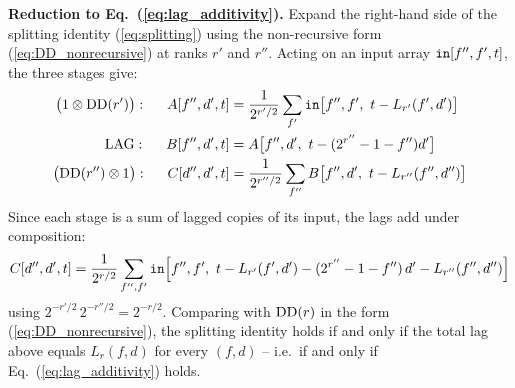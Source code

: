 \documentclass{article}
\numberwithin{equation}{section}   %
\def\DD{{\rm DD}}
\def\LAG{{\rm LAG}}
\def\nn{\nonumber}
\begin{document}
\par\noindent
{\bf Reduction to Eq.\ (\ref{eq:lag_additivity}).}
Expand the right-hand side of the splitting identity (\ref{eq:splitting}) using the
non-recursive form (\ref{eq:DD_nonrecursive}) at ranks $r'$ and $r''$. Acting on an input array
${\tt in}[f'', f', t]$, the three stages give:
\begin{align}
\big( 1 \otimes \DD(r') \big): \hspace{0.5cm}
  A[f'', d', t] &= \frac{1}{2^{r'/2}} \sum_{f'} {\tt in}\big[ f'', f',\ t - L_{r'}(f', d') \big] \nn \\
\LAG: \hspace{0.5cm}
  B[f'', d', t] &= A\big[ f'', d',\ t - (2^{r''}-1-f'') d' \big] \nn \\
\big( \DD(r'') \otimes 1 \big): \hspace{0.5cm}
  C[d'', d', t] &= \frac{1}{2^{r''/2}} \sum_{f''} B\big[ f'', d',\ t - L_{r''}(f'', d'') \big]
\end{align}
Since each stage is a sum of lagged copies of its input, the lags add under composition:
\begin{equation}
C[d'', d', t] = \frac{1}{2^{r/2}} \sum_{f'', f'}
  {\tt in}\Big[ f'', f',\ t - L_{r'}(f',d') - (2^{r''}-1-f'')\,d' - L_{r''}(f'',d'') \Big]
\end{equation}
using $2^{-r'/2}\, 2^{-r''/2} = 2^{-r/2}$. Comparing with $\DD(r)$ in the form
(\ref{eq:DD_nonrecursive}), the splitting identity holds if and only if the total lag above
equals $L_r(f,d)$ for every $(f,d)$ -- i.e.\ if and only if Eq.\ (\ref{eq:lag_additivity})
holds.
\end{document}
